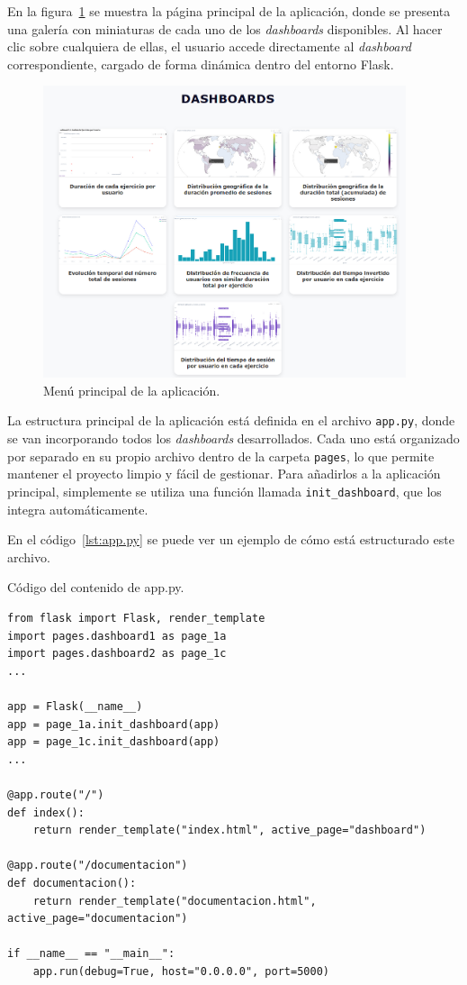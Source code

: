 \documentclass[a4paper, 12pt]{book}
\begin{document}
En la figura~\ref{fig:menu} se muestra la página principal de la aplicación, donde se presenta una galería con miniaturas de cada uno de los \textit{dashboards} disponibles. Al hacer clic sobre cualquiera de ellas, el usuario accede directamente al \textit{dashboard} correspondiente, cargado de forma dinámica dentro del entorno Flask.

\begin{figure}[H]
\centering
\includegraphics[width=0.95\textwidth]{img/menu.png}
\caption{Menú principal de la aplicación.}
\label{fig:menu}
\end{figure}

La estructura principal de la aplicación está definida en el archivo \texttt{app.py}, donde se van incorporando todos los \textit{dashboards} desarrollados. Cada uno está organizado por separado en su propio archivo dentro de la carpeta \texttt{pages}, lo que permite mantener el proyecto limpio y fácil de gestionar. Para añadirlos a la aplicación principal, simplemente se utiliza una función llamada \texttt{init\_dashboard}, que los integra automáticamente.

En el código~\ref{lst:app.py} se puede ver un ejemplo de cómo está estructurado este archivo.

\begin{listing}[h!]
\caption{Código del contenido de app.py.}
\label{lst:app.py}
\begin{verbatim}
from flask import Flask, render_template
import pages.dashboard1 as page_1a
import pages.dashboard2 as page_1c
...

app = Flask(__name__)
app = page_1a.init_dashboard(app)
app = page_1c.init_dashboard(app)
...

@app.route("/")
def index():
    return render_template("index.html", active_page="dashboard")

@app.route("/documentacion")
def documentacion():
    return render_template("documentacion.html", active_page="documentacion")

if __name__ == "__main__":
    app.run(debug=True, host="0.0.0.0", port=5000)
\end{verbatim}
\end{listing}
\end{document}
